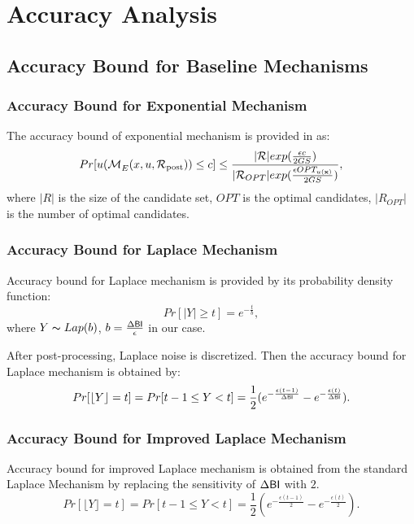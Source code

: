 \documentclass{article}
\begin{document}
\section{Accuracy Analysis}

\subsection{Accuracy Bound for Baseline Mechanisms}

\subsubsection{Accuracy Bound for Exponential Mechanism}
\label{subsec_accuracy_global}
The accuracy bound of exponential mechanism is provided in \cite{dwork2014algorithmic} as:
\begin{equation*}
Pr[u(\mathcal{M}_E^{}({x},{u},{\mathcal{R}_{\textup{post}}})) \leq c] 
		 \leq \frac{|\mathcal{R}|exp(\frac{\epsilon c}{2 GS})}{|\mathcal{R}_{OPT}| exp(\frac{\epsilon OPT_{u(\textbf{x})}}{2 GS})},
\end{equation*}
where $|R|$ is the size of the candidate set, $OPT$ is the optimal candidates, $|R_{OPT}|$ is the number of optimal candidates.


\subsubsection{Accuracy Bound for Laplace Mechanism}
\label{subsec_accuracy_lap}
Accuracy bound for Laplace mechanism is provided by its probability density function:
\begin{equation*}
Pr[|Y| \geq t] = e^{- \frac{t}{b}},
\end{equation*}
where $Y \thicksim Lap(b)$, $b = \frac{\Delta \mathsf{BI}}{\epsilon}$ in our case.

After post-processing, Laplace noise is discretized. Then the accuracy bound for Laplace mechanism is obtained by:
\[
Pr[\lfloor Y \rfloor = t] = Pr[ t-1 \leq Y < t] = \frac{1}{2} (e^{- \frac{\epsilon (t - 1)}{\Delta \mathsf{BI}}} - e^{- \frac{\epsilon (t)}{\Delta \mathsf{BI}}}).
\]

\subsubsection{Accuracy Bound for Improved Laplace Mechanism}
\label{subsec_accuracy_lap}
Accuracy bound for improved Laplace mechanism is obtained from the standard Laplace Mechanism by replacing the sensitivity of $\Delta \mathsf{BI}$ with $2$.
\[
Pr[\lfloor Y \rfloor = t] = Pr[ t-1 \leq Y < t] = \frac{1}{2} (e^{- \frac{\epsilon (t - 1)}{2}} - e^{- \frac{\epsilon (t)}{2}}).
\]
\end{document}
